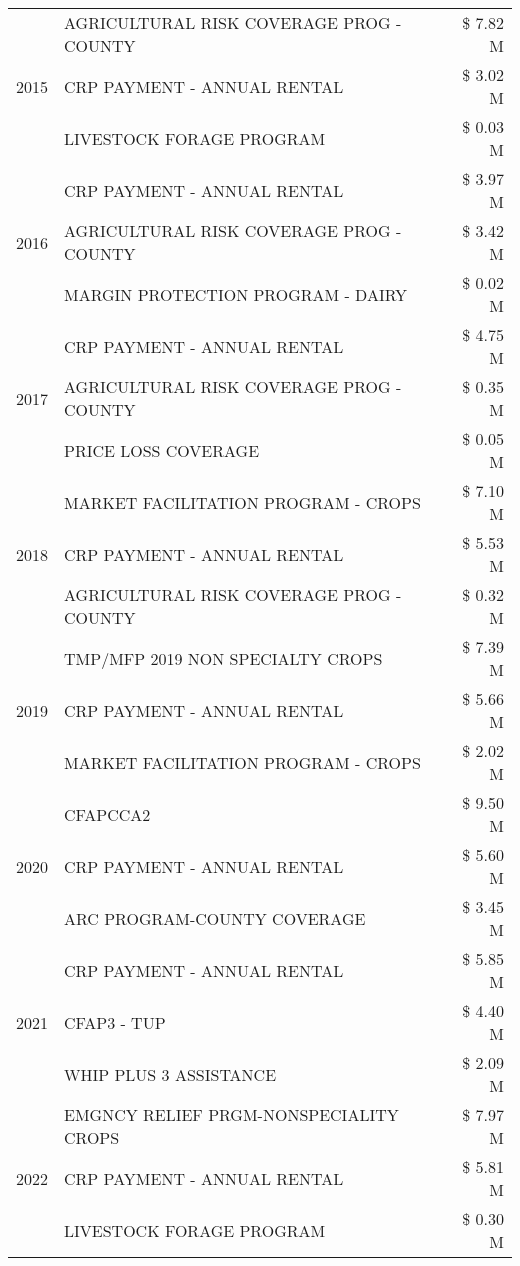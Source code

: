 \begin{tabular}{llr}
\cline{1-3}
\multirow[t]{3}{*}{2015} & AGRICULTURAL RISK COVERAGE PROG - COUNTY & \$ 7.82 M \\
 & CRP PAYMENT - ANNUAL RENTAL & \$ 3.02 M \\
 & LIVESTOCK FORAGE PROGRAM & \$ 0.03 M \\
\cline{1-3}
\multirow[t]{3}{*}{2016} & CRP PAYMENT - ANNUAL RENTAL & \$ 3.97 M \\
 & AGRICULTURAL RISK COVERAGE PROG - COUNTY & \$ 3.42 M \\
 & MARGIN PROTECTION PROGRAM - DAIRY & \$ 0.02 M \\
\cline{1-3}
\multirow[t]{3}{*}{2017} & CRP PAYMENT - ANNUAL RENTAL & \$ 4.75 M \\
 & AGRICULTURAL RISK COVERAGE PROG - COUNTY & \$ 0.35 M \\
 & PRICE LOSS COVERAGE & \$ 0.05 M \\
\cline{1-3}
\multirow[t]{3}{*}{2018} & MARKET FACILITATION PROGRAM - CROPS & \$ 7.10 M \\
 & CRP PAYMENT - ANNUAL RENTAL & \$ 5.53 M \\
 & AGRICULTURAL RISK COVERAGE PROG - COUNTY & \$ 0.32 M \\
\cline{1-3}
\multirow[t]{3}{*}{2019} & TMP/MFP 2019 NON SPECIALTY CROPS & \$ 7.39 M \\
 & CRP PAYMENT - ANNUAL RENTAL & \$ 5.66 M \\
 & MARKET FACILITATION PROGRAM - CROPS & \$ 2.02 M \\
\cline{1-3}
\multirow[t]{3}{*}{2020} & CFAPCCA2 & \$ 9.50 M \\
 & CRP PAYMENT - ANNUAL RENTAL & \$ 5.60 M \\
 & ARC PROGRAM-COUNTY COVERAGE & \$ 3.45 M \\
\cline{1-3}
\multirow[t]{3}{*}{2021} & CRP PAYMENT - ANNUAL RENTAL & \$ 5.85 M \\
 & CFAP3 - TUP & \$ 4.40 M \\
 & WHIP PLUS 3 ASSISTANCE & \$ 2.09 M \\
\cline{1-3}
\multirow[t]{3}{*}{2022} & EMGNCY RELIEF PRGM-NONSPECIALITY CROPS & \$ 7.97 M \\
 & CRP PAYMENT - ANNUAL RENTAL & \$ 5.81 M \\
 & LIVESTOCK FORAGE PROGRAM & \$ 0.30 M \\
\cline{1-3}
\bottomrule
\end{tabular}
